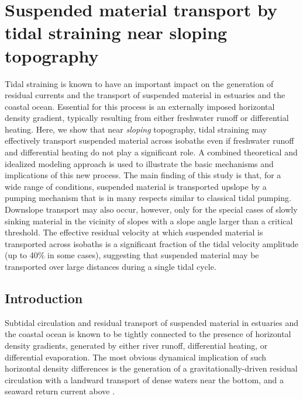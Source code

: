 \chapter{Suspended material transport by tidal straining
  near sloping topography}
\label{kap-slope}

Tidal straining is known to have an important impact on the
  generation of residual currents and the transport of suspended
  material in estuaries and the coastal ocean. Essential for this
  process is an externally imposed horizontal density gradient,
  typically resulting from either freshwater runoff or differential
  heating. Here, we show that near \emph{sloping} topography, tidal
  straining may effectively transport suspended material across
  isobaths even if freshwater runoff and differential heating do not
  play a significant role. A combined theoretical and idealized
  modeling approach is used to illustrate the basic mechanisms and
  implications of this new process. The main finding of this study is
  that, for a wide range of conditions, suspended material is
  transported upslope by a pumping mechanism that is in many respects
  similar to classical tidal pumping. Downslope transport may also
  occur, however, only for the special cases of slowly sinking
  material in the vicinity of slopes with a slope angle larger than a
  critical threshold. The effective residual velocity at which
  suspended material is transported across isobaths is a significant
  fraction of the tidal velocity amplitude (up to 40\% in some cases),
  suggesting that suspended material may be transported over large
  distances during a single tidal cycle. \citep{schulzumlauf2016}

\section{Introduction\label{sec:intro}}
Subtidal circulation and residual transport of suspended material in
estuaries and the coastal ocean is known to be tightly connected to
the presence of horizontal density gradients, generated by either
river runoff, differential heating, or differential evaporation. The
most obvious dynamical implication of such horizontal density
differences is the generation of a gravitationally-driven residual
circulation with a landward transport of dense waters near the bottom,
and a seaward return current above
\citep{Pritchard1952,MacCreadyGeyer2010}.

